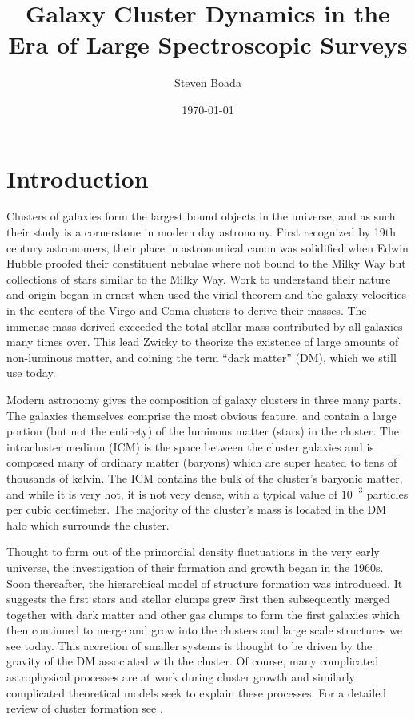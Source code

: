 \documentclass[12pt]{article}
\begin{document}
\title{Galaxy Cluster Dynamics in the Era of Large Spectroscopic Surveys}
\author{Steven Boada}
\date{\today}

\maketitle

\section{Introduction}\label{sec:introduction}
Clusters of galaxies form the largest bound objects in the universe, and as such their study is a cornerstone in modern day astronomy. First recognized by 19th century astronomers, their place in astronomical canon was solidified when Edwin Hubble proofed their constituent nebulae where not bound to the Milky Way \citep{Hubble1926} but collections of stars similar to the Milky Way. Work to understand their nature and origin began in ernest when \cite{Hubble1931} used the virial theorem and the galaxy velocities in the centers of the Virgo \citep{Smith1936} and Coma \citep{Zwicky1933} clusters to derive their masses. The immense mass derived exceeded the total stellar mass contributed by all galaxies many times over. This lead Zwicky to theorize the existence of large amounts of non-luminous matter, and coining the term ``dark matter'' (DM), which we still use today.  

Modern astronomy gives the composition of galaxy clusters in three many parts. The galaxies themselves comprise the most obvious feature, and contain a large portion (but not the entirety) of the luminous matter (stars) in the cluster. The intracluster medium (ICM) is the space between the cluster galaxies and is composed many of ordinary matter (baryons) which are super heated to tens of thousands of kelvin. The ICM contains the bulk of the cluster's baryonic matter, and while it is very hot, it is not very dense, with a typical value of $10^{-3}$ particles per cubic centimeter. The majority of the cluster's mass is located in the DM halo which surrounds the cluster. 

Thought to form out of the primordial density fluctuations in the very early universe, the investigation of their formation and growth began in the 1960s. Soon thereafter, the hierarchical model of structure formation \citep{Press1974, Gott1975, White1978} was introduced. It suggests the first stars and stellar clumps grew first then subsequently merged together with dark matter and other gas clumps to form the first galaxies which then continued to merge and grow into the clusters and large scale structures we see today. This accretion of smaller systems is thought to be driven by the gravity of the DM associated with the cluster. Of course, many complicated astrophysical processes are at work during cluster growth and similarly complicated theoretical models seek to explain these processes. For a detailed review of cluster formation see \cite{Kravtsov2012}.
\end{document}
